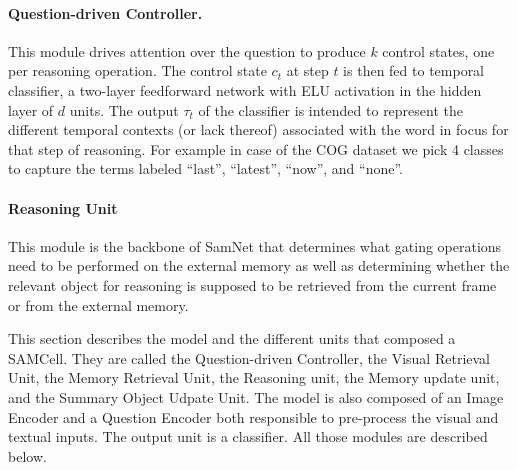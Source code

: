 \paragraph{Question-driven Controller.}

%

This module drives attention over the question to produce $k$ control states, one per reasoning operation. 
The control state $c_t$ at step $t$ is then fed to temporal classifier, a two-layer feedforward network with ELU activation in the hidden layer of $d$ units.
The output $\tau_t$ of the classifier is intended to represent the different temporal contexts (or lack thereof) associated with the word in focus for that step of reasoning.	
For example in case of the COG dataset we pick 4 classes to capture the terms labeled ``last'', ``latest'', ``now'', and ``none''.

\paragraph{Reasoning Unit}
This module is the backbone of SamNet that determines what gating operations need to be performed on the external memory as well as determining whether the relevant object for reasoning is supposed to be retrieved from the current frame or from the external memory.




This section describes the model and the different units that composed a SAMCell. They are called the Question-driven Controller, the Visual Retrieval Unit, the Memory Retrieval Unit, the Reasoning unit, the Memory update unit, and the Summary Object Udpate Unit. 
The model is also composed of an Image Encoder and a Question Encoder both responsible to pre-process the visual and textual inputs. The output unit is a classifier.
All those modules are described below.




